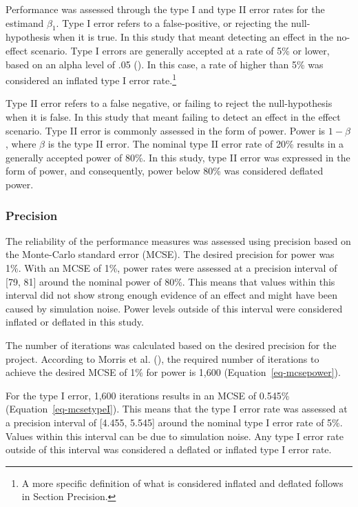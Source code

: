 \documentclass[
  man,
  floatsintext,
  longtable,
  nolmodern,
  notxfonts,
  notimes,
  colorlinks=true,linkcolor=blue,citecolor=blue,urlcolor=blue]{apa7}
\begin{document}
Performance was assessed through the type I and type II error rates for
the estimand \(\beta_1\). Type I error refers to a false-positive, or
rejecting the null-hypothesis when it is true. In this study that meant
detecting an effect in the no-effect scenario. Type I errors are
generally accepted at a rate of 5\% or lower, based on an alpha level of
.05 (). In this case, a rate of
higher than 5\% was considered an inflated type I error rate.\footnote{A
  more specific definition of what is considered inflated and deflated
  follows in Section Precision.}

Type II error refers to a false negative, or failing to reject the
null-hypothesis when it is false. In this study that meant failing to
detect an effect in the effect scenario. Type II error is commonly
assessed in the form of power. Power is \(1-\beta\), where \(\beta\) is
the type II error. The nominal type II error rate of 20\% results in a
generally accepted power of 80\%. In this study, type II error was
expressed in the form of power, and consequently, power below 80\% was
considered deflated power.\footnotemark[1]

\subsubsection{Precision}\label{precision}

The reliability of the performance measures was assessed using precision
based on the Monte-Carlo standard error (MCSE). The desired precision
for power was 1\%. With an MCSE of 1\%, power rates were assessed at a
precision interval of {[}79, 81{]} around the nominal power of 80\%.
This means that values within this interval did not show strong enough
evidence of an effect and might have been caused by simulation noise.
Power levels outside of this interval were considered inflated or
deflated in this study.

The number of iterations was calculated based on the desired precision
for the project. According to Morris et al.
(), the required number of iterations to
achieve the desired MCSE of 1\% for power is 1,600
(Equation~\ref{eq-mcsepower}).

For the type I error, 1,600 iterations results in an MCSE of 0.545\%
(Equation~\ref{eq-mcsetypeI}). This means that the type I error rate was
assessed at a precision interval of {[}4.455, 5.545{]} around the
nominal type I error rate of 5\%. Values within this interval can be due
to simulation noise. Any type I error rate outside of this interval was
considered a deflated or inflated type I error rate.
\end{document}
